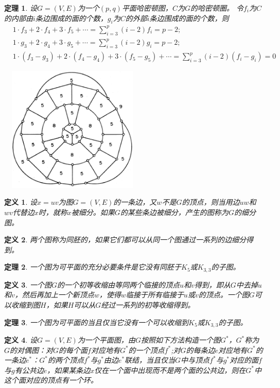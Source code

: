 \documentclass{article}
\newtheorem{Def}{定义}
\newtheorem{Thm}{定理}
\begin{document}
\begin{CJK*}{UTF8}{gbsn}
  \begin{Thm}
    设$G=(V,E)$为一个$(p,q)$平面哈密顿图，$C$为$G$的哈密顿圈。
    令$f_i$为$C$的内部由$i$条边围成的面的个数，$g_i$为$C$的外部$i$条边围成的面的个数，则
    \begin{align}
      &1 \cdot f_3 + 2 \cdot f_4 + 3 \cdot f_5 + \cdots = \sum_{i=3}^p(i-2)f_i = p - 2;\\
      &1 \cdot g_3 + 2 \cdot g_4 + 3 \cdot g_5 + \cdots = \sum_{i=3}^p(i-2)g_i = p - 2;\\
      &1 \cdot (f_3 - g_3) + 2 \cdot (f_4 - g_4) + 3 \cdot (f_5 - g_5) + \cdots = \sum_{i=3}^p(i-2)(f_i - g_i) = 0
    \end{align}
  \end{Thm}
    \centering
  \includegraphics[width=7cm, height=6cm]{grinberg}
  \begin{Def}
    设$x=uv$为图$G=(V,E)$的一条边，又$w$不是$G$的顶点，则当用边$uw$和$wv$代替边$x$时，就称$x$被细分。如果$G$的某些条边被细分，产生的图称为$G$的细分图。
  \end{Def}
  \begin{Def}
    两个图称为同胚的，如果它们都可以从同一个图通过一系列的边细分得到。
  \end{Def}
  \begin{Thm}
    一个图为可平面的充分必要条件是它没有同胚于$K_5$或$K_{3,3}$的子图。
  \end{Thm}
  \begin{Def}
    一个图$G$的一个初等收缩由等同两个临接的顶点$u$和$v$得到，即从$G$中去掉$u$和$v$，然后再加上一个新顶点$w$，使得$w$临接于所有临接于$u$或$v$的顶点。一个图$G$可以收缩到图$H$，如果$H$可以从$G$经过一系列的初等收缩得到。
  \end{Def}
  \begin{Thm}
    一个图为可平面的当且仅当它没有一个可以收缩到$K_5$或$K_{3,3}$的子图。
  \end{Thm}
  \begin{Def}
    设$G=(V,E)$为一个平面图，由$G$按照如下方法构造一个图$G^*$，$G^*$称为$G$的对偶图：对$G$的每个面$f$对应地有$G^*$的一个顶点$f^*$;对$G$的每条边$e$对应地有$G^*$的一条边$e^*$：$G^*$的两个顶点$f^*$与$g^*$由边$e^*$联结，当且仅当$G$中与顶点$f^*$与$g^*$对应的面$f$与$g$有公共边$e$，如果某条边$x$仅在一个面中出现而不是两个面的公共边，则在$G^*$中这个面对应的顶点有一个环。

\end{Def}
\end{CJK*}
\end{document}
